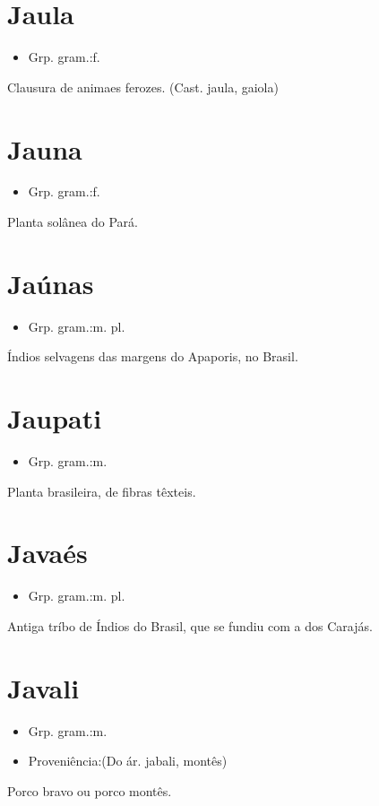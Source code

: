 \documentclass{article}
\begin{document}
\section{Jaula}
\begin{itemize}
\item {Grp. gram.:f.}
\end{itemize}
Clausura de animaes ferozes.
(Cast. \textunderscore jaula\textunderscore , gaiola)
\section{Jauna}
\begin{itemize}
\item {Grp. gram.:f.}
\end{itemize}
Planta solânea do Pará.
\section{Jaúnas}
\begin{itemize}
\item {Grp. gram.:m. pl.}
\end{itemize}
Índios selvagens das margens do Apaporis, no Brasil.
\section{Jaupati}
\begin{itemize}
\item {Grp. gram.:m.}
\end{itemize}
Planta brasileira, de fibras têxteis.
\section{Javaés}
\begin{itemize}
\item {Grp. gram.:m. pl.}
\end{itemize}
Antiga tríbo de Índios do Brasil, que se fundiu com a dos Carajás.
\section{Javali}
\begin{itemize}
\item {Grp. gram.:m.}
\end{itemize}
\begin{itemize}
\item {Proveniência:(Do ár. \textunderscore jabali\textunderscore , montês)}
\end{itemize}
Porco bravo ou porco montês.
\end{document}

